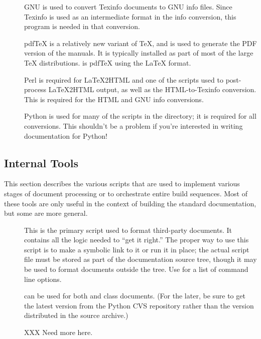 \documentclass{howto}
\begin{document}
\begin{description}
      \item[]
        GNU  is used to convert Texinfo documents to
        GNU info files.  Since Texinfo is used as an intermediate
        format in the info conversion, this program is needed in that
        conversion.

      \item[]
        pdf\TeX{} is a relatively new variant of \TeX, and is used to
        generate the PDF version of the manuals.  It is typically
        installed as part of most of the large \TeX{} distributions.
         is pdf\TeX{} using the \LaTeX{} format.

      \item[]
        Perl is required for \LaTeX2HTML{} and one of the scripts used
        to post-process \LaTeX2HTML output, as well as the
        HTML-to-Texinfo conversion.  This is required for
        the HTML and GNU info conversions.

      \item[]
        Python is used for many of the scripts in the
         directory; it is required for all
        conversions.  This shouldn't be a problem if you're interested
        in writing documentation for Python!
    \end{description}


  \subsection{Internal Tools}

    This section describes the various scripts that are used to
    implement various stages of document processing or to orchestrate
    entire build sequences.  Most of these tools are only useful
    in the context of building the standard documentation, but some
    are more general.

    \begin{description}
      \item[]
        This is the primary script used to format third-party
	documents.  It contains all the logic needed to ``get it
	right.''  The proper way to use this script is to make a
	symbolic link to it or run it in place; the actual script file 
	must be stored as part of the documentation source tree,
	though it may be used to format documents outside the
	tree.  Use  
        for a list of
        command line options.

         can be used for both  and
         class documents.  (For the later, be sure to get 
	the latest version from the Python CVS repository rather than
        the version distributed in the  source
	archive.)

	XXX  Need more here.
    \end{description}
\end{document}

